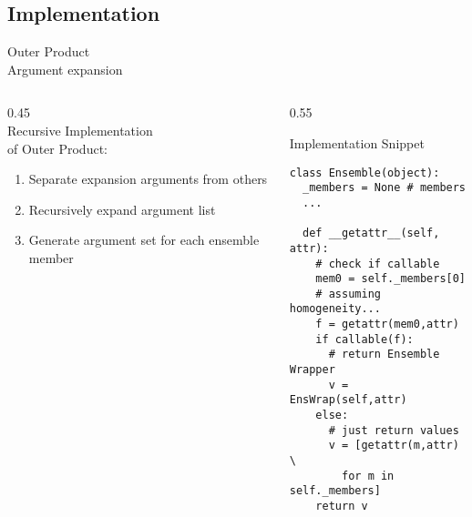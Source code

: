 \documentclass[hyperref={pdfpagelabels=false},compress,final]{beamer}
\newenvironment{myBox}[3][shadow=true]%
{\begin{center} \begin{minipage}{#2} \begin{beamerboxesrounded}[#1]{#3} \smallskip}%
      {\smallskip \end{beamerboxesrounded} \end{minipage} \end{center}}
\begin{document}
\subsection*{Implementation}

\begin{frame}[fragile=singleslide]{\hspace*{0.03\textwidth}Outer Product\\ \hspace*{0.03\textwidth}Argument expansion}
  \begin{columns}
    \begin{column}{0.45\textwidth}
      \medskip \\
      { \large Recursive Implementation \\ \smallskip of { Outer Product}:} \\ 
      \small
      \begin{enumerate}
        \item Separate expansion arguments from others
        \item Recursively expand argument list
        \item Generate argument set for each ensemble member
      \end{enumerate}
    \end{column}
    \begin{column}{0.55\textwidth}
      \vspace*{-1.cm}
      \begin{myBox}{1.\textwidth}{Implementation Snippet}
        \small
        \begin{verbatim}
class Ensemble(object):
  _members = None # members
  ...
  
  def __getattr__(self, attr):
    # check if callable
    mem0 = self._members[0] 
    # assuming homogeneity...
    f = getattr(mem0,attr)
    if callable(f):
      # return Ensemble Wrapper
      v = EnsWrap(self,attr)
    else:
      # just return values
      v = [getattr(m,attr) \
        for m in self._members]
    return v
    
        \end{verbatim}
      \end{myBox}
    \end{column}
  \end{columns}
\end{frame}


\end{document}
